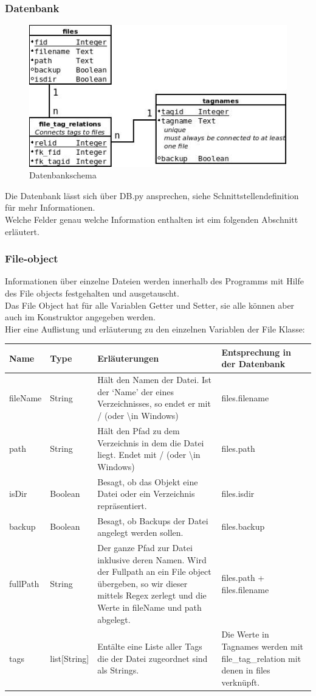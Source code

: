 \documentclass[10pt,paper=a4,final]{scrartcl}
\begin{document}
\subsubsection{Datenbank}
\begin{figure}[h!]
\includegraphics[scale=1.0]{db.jpeg}
\caption{Datenbankschema}
\end{figure}
Die Datenbank l\"asst sich \"uber DB.py ansprechen, siehe Schnittstellendefinition f\"ur mehr Informationen.\\
Welche Felder genau welche Information enthalten ist eim folgenden Abschnitt erl\"autert.
\subsubsection{File-object}
Informationen \"uber einzelne Dateien werden innerhalb des Programms mit Hilfe des File objects festgehalten und ausgetauscht.\\
Das File Object hat f\"ur alle Variablen Getter und Setter, sie alle k\"onnen aber auch im Konstruktor angegeben werden.\\
Hier eine Auflistung und erl\"auterung zu den einzelnen Variablen der File Klasse:
\begin{tabularx}{\textwidth}{|l|l|X|X|}
  \hline
  \bf Name & \bf Type & \bf Erl\"auterungen & \bf Entsprechung in der Datenbank \\ \hline
  fileName & String & H\"alt den Namen der Datei. Ist der ‘Name’ der eines Verzeichnisses, so endet er mit / (oder \textbackslash in Windows) & files.filename \\ \hline
  path & String & H\"alt den Pfad zu dem Verzeichnis in dem die Datei liegt. Endet mit / (oder \textbackslash in Windows) & files.path \\ \hline
  isDir & Boolean & Besagt, ob das Objekt eine Datei oder ein Verzeichnis repräsentiert. & files.isdir \\ \hline
  backup & Boolean & Besagt, ob Backups der Datei angelegt werden sollen. & files.backup \\ \hline
  fullPath & String & Der ganze Pfad zur Datei inklusive deren Namen. Wird der Fullpath an ein File object \"ubergeben, so wir dieser mittels Regex zerlegt und die Werte in fileName und path abgelegt. & files.path + files.filename \\ \hline
  tags & list[String] & Ent\"alte eine Liste aller Tags die der Datei zugeordnet sind als Strings. & Die Werte in Tagnames werden mit file\_tag\_relation mit denen in files verkn\"upft. \\ \hline
\end{tabularx}
\end{document}
